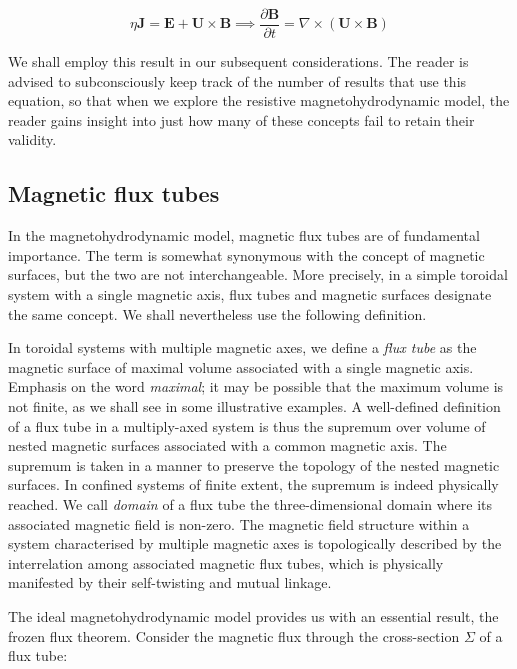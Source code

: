 \begin{equation}
    \label{eq-6-15-x}
    \eta\mathbf{J}=\mathbf{E}+\mathbf{U}\times\mathbf{B}\implies\frac{\partial\mathbf{B}}{\partial t}=\nabla\times(\mathbf{U}\times\mathbf{B})
\end{equation}

We shall employ this result in our subsequent considerations. The reader is advised to subconsciously keep track of the number of results that use this equation, so that when we explore the resistive magnetohydrodynamic model, the reader gains insight into just how many of these concepts fail to retain their validity.

\subsection{Magnetic flux tubes}

In the magnetohydrodynamic model, magnetic flux tubes are of fundamental importance. The term is somewhat synonymous with the concept of magnetic surfaces, but the two are not interchangeable. More precisely, in a simple toroidal system with a single magnetic axis, flux tubes and magnetic surfaces designate the same concept. We shall nevertheless use the following definition.

\quad In toroidal systems with multiple magnetic axes, we define a \textit{flux tube} as the magnetic surface of maximal volume associated with a single magnetic axis. Emphasis on the word \textit{maximal}; it may be possible that the maximum volume is not finite, as we shall see in some illustrative examples. A well-defined definition of a flux tube in a multiply-axed system is thus the supremum over volume of nested magnetic surfaces associated with a common magnetic axis. The supremum is taken in a manner to preserve the topology of the nested magnetic surfaces. In confined systems of finite extent, the supremum is indeed physically reached. We call \textit{domain} of a flux tube the three-dimensional domain where its associated magnetic field is non-zero. The magnetic field structure within a system characterised by multiple magnetic axes is topologically described by the interrelation among associated magnetic flux tubes, which is physically manifested by their self-twisting and mutual linkage. 

\quad The ideal magnetohydrodynamic model provides us with an essential result, the frozen flux theorem. Consider the magnetic flux through the cross-section $\Sigma$ of a flux tube:

